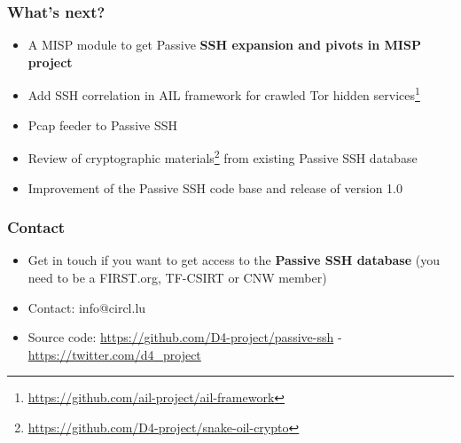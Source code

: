 \documentclass{beamer}
\begin{document}
\begin{frame}
        \frametitle{What's next?}
        \begin{itemize}
               \item A MISP module to get Passive {\bf SSH expansion and pivots in MISP project}
               \item Add SSH correlation in AIL framework for crawled Tor hidden services\footnote{\url{https://github.com/ail-project/ail-framework}}
               \item Pcap feeder to Passive SSH
               \item Review of cryptographic materials\footnote{\url{https://github.com/D4-project/snake-oil-crypto}} from existing Passive SSH database
               \item Improvement of the Passive SSH code base and release of version 1.0
        \end{itemize}
\end{frame}

\begin{frame}
\frametitle{Contact}
\begin{itemize}
        \item Get in touch if you want to get access to the {\bf Passive SSH database} (you need to be a FIRST.org, TF-CSIRT or CNW member)
\item Contact: info@circl.lu
\item Source code: \url{https://github.com/D4-project/passive-ssh} -  \url{https://twitter.com/d4_project}
\end{itemize}
\end{frame}
\end{document}
